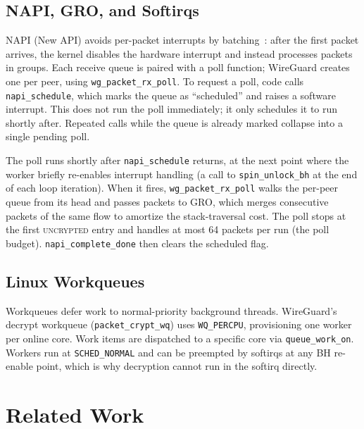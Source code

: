 \documentclass{article}
\begin{document}
\subsection{NAPI, GRO, and Softirqs}

NAPI (New API) avoids per-packet interrupts by batching~\cite{linux-napi}:
after the first packet arrives, the kernel disables the hardware interrupt and
instead processes packets in groups. Each receive queue is paired with a poll function; WireGuard
creates one per peer, using \texttt{wg\_packet\_rx\_poll}. To request a poll,
code calls \texttt{napi\_schedule}, which marks the queue as ``scheduled'' and
raises a software interrupt. This does not run the poll immediately; it only
schedules it to run shortly after. Repeated calls while the queue is already
marked collapse into a single pending poll.

The poll runs shortly after \texttt{napi\_schedule} returns, at the next point
where the worker briefly re-enables interrupt handling (a call to
\texttt{spin\_unlock\_bh} at the end of each loop iteration). When it fires,
\texttt{wg\_packet\_rx\_poll} walks the per-peer queue from its head and passes
packets to GRO, which merges consecutive packets of the same flow to amortize
the stack-traversal cost. The poll stops at the first \textsc{uncrypted} entry
and handles at most 64 packets per run (the poll budget).
\texttt{napi\_complete\_done} then clears the scheduled flag.

\subsection{Linux Workqueues}

Workqueues defer work to normal-priority background threads. WireGuard's decrypt
workqueue (\texttt{packet\_crypt\_wq}) uses \texttt{WQ\_PERCPU}, provisioning
one worker per online core. Work items are dispatched to a specific core via
\texttt{queue\_work\_on}. Workers run at \texttt{SCHED\_NORMAL} and can be
preempted by softirqs at any BH re-enable point, which is why decryption cannot
run in the softirq directly.

\section{Related Work}
\label{sec:sota}
\end{document}
